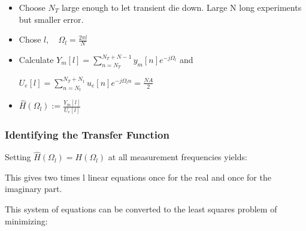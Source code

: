 \documentclass[7pt,a4paper]{scrartcl}
\begin{document}
\begin{multicols*}{4}
\begin{itemize}[leftmargin=*]
\ncompaq
\item Choose $N_T$ large enough to let transient die down. Large N \dahe long experiments but smaller error.
\item Chose $l,\quad \Omega_l=\frac{2\pi l}{N}$
\item Calculate $Y_m[l]=\sum\limits_{n=N_T}^{N_T+N-1}y_m[n]e^{-j\Omega_l}$ and

$U_e[l]=\sum\limits_{n=N_t}^{N_T+N_1}u_e[n]e^{-j\Omega_ln}=\frac{NA}{2}$
\item $\hat{H}(\Omega_l):=\frac{Y_m[l]}{U_e[l]}$
\end{itemize}

\subsubsection*{Identifying the Transfer Function}


Setting $\hat{H}(\Omega_l)=H(\Omega_l)$ at all measurement frequencies yields:


This gives two times l linear equations once for the real and once for the imaginary part.


This system of equations can be converted to the least squares problem of minimizing:


\end{multicols*}
\end{document}
